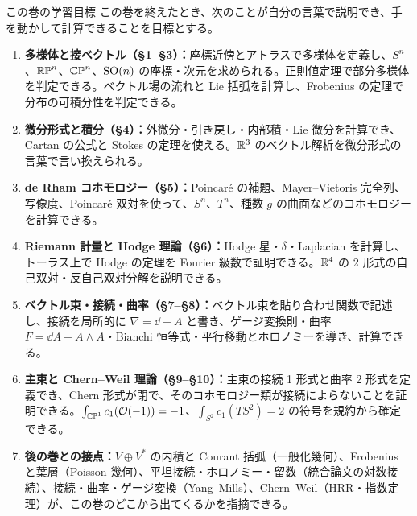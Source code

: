 \begin{goalbox}{この巻の学習目標}
この巻を終えたとき、次のことが自分の言葉で説明でき、手を動かして計算できることを目標とする。
\begin{enumerate}[leftmargin=2em]
\item \textbf{多様体と接ベクトル（§1--§3）：}座標近傍とアトラスで多様体を定義し、$S^n$、\allowbreak $\mathbb{RP}^n$、\allowbreak $\mathbb{CP}^n$、\allowbreak $\mathrm{SO}(n)$ の座標・次元を求められる。正則値定理で部分多様体を判定できる。ベクトル場の流れと Lie 括弧を計算し、Frobenius の定理で分布の可積分性を判定できる。
\item \textbf{微分形式と積分（§4）：}外微分・引き戻し・内部積・Lie 微分を計算でき、Cartan の公式と Stokes の定理を使える。$\mathbb R^3$ のベクトル解析を微分形式の言葉で言い換えられる。
\item \textbf{de Rham コホモロジー（§5）：}Poincaré の補題、Mayer--Vietoris 完全列、写像度、Poincaré 双対を使って、$S^n$、$T^n$、種数 $g$ の曲面などのコホモロジーを計算できる。
\item \textbf{Riemann 計量と Hodge 理論（§6）：}Hodge 星・$\delta$・Laplacian を計算し、トーラス上で Hodge の定理を Fourier 級数で証明できる。$\mathbb R^4$ の 2 形式の自己双対・反自己双対分解を説明できる。
\item \textbf{ベクトル束・接続・曲率（§7--§8）：}ベクトル束を貼り合わせ関数で記述し、接続を局所的に $\nabla=\dd+A$ と書き、ゲージ変換則・曲率 $F=\dd A+A\wedge A$・Bianchi 恒等式・平行移動とホロノミーを導き、計算できる。
\item \textbf{主束と Chern--Weil 理論（§9--§10）：}主束の接続 1 形式と曲率 2 形式を定義でき、Chern 形式が閉で、そのコホモロジー類が接続によらないことを証明できる。\allowbreak $\int_{\mathbb{CP}^1}c_1(\mathcal O(-1))=-1$、\allowbreak $\int_{S^2}c_1(TS^2)=2$ の符号を規約から確定できる。
\item \textbf{後の巻との接点：}$V\oplus V^*$ の内積と Courant 括弧（一般化幾何）、Frobenius と葉層（Poisson 幾何）、平坦接続・ホロノミー・留数（統合論文の対数接続）、接続・曲率・ゲージ変換（Yang--Mills）、Chern--Weil（HRR・指数定理）が、この巻のどこから出てくるかを指摘できる。
\end{enumerate}
\end{goalbox}


